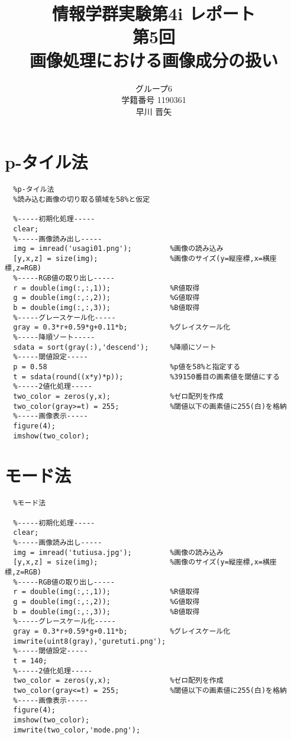 \documentclass[a4j]{jarticle}
\title{
\vspace{30mm}
{\bf 情報学群実験第4i レポート}
\\
\vspace{5mm}
第5回\\
\vspace{5mm}
{\bf 画像処理における画像成分の扱い}
\vspace{90mm}
}
\author{
\vspace{5mm}
グループ6 \\
\vspace{5mm}
学籍番号 1190361 \\
\vspace{5mm}
{\large 早川 晋矢}
\vspace{10mm}
}
\begin{document}
\maketitle

\newpage



\section{p-タイル法}
\label{sect:ouyou10_2}
\begin{verbatim}
  %p-タイル法
  %読み込む画像の切り取る領域を58%と仮定

  %-----初期化処理-----
  clear;
  %-----画像読み出し-----
  img = imread('usagi01.png');         %画像の読み込み
  [y,x,z] = size(img);                 %画像のサイズ(y=縦座標,x=横座標,z=RGB)
  %-----RGB値の取り出し-----
  r = double(img(:,:,1));              %R値取得
  g = double(img(:,:,2));              %G値取得
  b = double(img(:,:,3));              %B値取得
  %-----グレースケール化-----
  gray = 0.3*r+0.59*g+0.11*b;          %グレイスケール化
  %-----降順ソート-----
  sdata = sort(gray(:),'descend');     %降順にソート
  %-----閾値設定-----
  p = 0.58                             %p値を58%と指定する
  t = sdata(round((x*y)*p));           %39150番目の画素値を閾値にする
  %-----2値化処理-----
  two_color = zeros(y,x);              %ゼロ配列を作成
  two_color(gray>=t) = 255;            %閾値以下の画素値に255(白)を格納
  %-----画像表示-----
  figure(4);
  imshow(two_color);
\end{verbatim}

\section{モード法}
\begin{verbatim}
  %モード法

  %-----初期化処理-----
  clear;
  %-----画像読み出し-----
  img = imread('tutiusa.jpg');         %画像の読み込み
  [y,x,z] = size(img);                 %画像のサイズ(y=縦座標,x=横座標,z=RGB)
  %-----RGB値の取り出し-----
  r = double(img(:,:,1));              %R値取得
  g = double(img(:,:,2));              %G値取得
  b = double(img(:,:,3));              %B値取得
  %-----グレースケール化-----
  gray = 0.3*r+0.59*g+0.11*b;          %グレイスケール化
  imwrite(uint8(gray),'guretuti.png');
  %-----閾値設定-----
  t = 140;
  %-----2値化処理-----
  two_color = zeros(y,x);              %ゼロ配列を作成
  two_color(gray<=t) = 255;            %閾値以下の画素値に255(白)を格納
  %-----画像表示-----
  figure(4);
  imshow(two_color);
  imwrite(two_color,'mode.png');
\end{verbatim}
\end{document}
